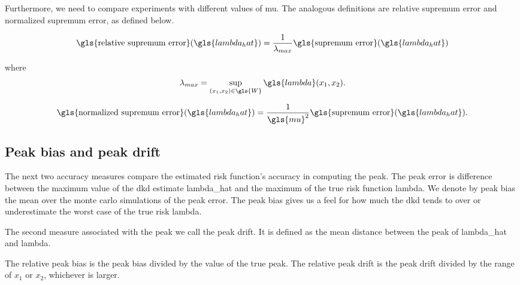 Furthermore, we need to compare experiments with different values of \gls{mu}.
The analogous definitions are \gls{relative supremum error} and \gls{normalized supremum error}, as defined below.

\begin{equation}
\label{eq:relative_supremum_error}
    \mbox{\gls{relative supremum error}}(\gls{lambda_hat}) = 
        \frac{1}{\lambda_{max}} \mbox{\gls{supremum error}}(\gls{lambda_hat}) \\
\end{equation}

where
\begin{equation}
\label{eq:lambda_max}
    \lambda_{max} = \sup_{(x_1, x_2) \in \gls{W}}{\gls{lambda}(x_1, x_2)} \text{.}
\end{equation}

\begin{equation}
\label{eq:normalized_supremum_error}
    \mbox{\gls{normalized supremum error}}(\gls{lambda_hat}) = 
        \frac{1}{\gls{mu}^2} \mbox{\gls{supremum error}}(\gls{lambda_hat}) \text{.}
\end{equation}

\subsection{Peak bias and peak drift}
\label{subsec:method:peak_bias}

The next two accuracy measures compare the estimated risk function's accuracy in computing the peak.
The \gls{peak error} is difference between the maximum value of the \gls{dkd} estimate \gls{lambda_hat} and the maximum of the true risk function \gls{lambda}.
We denote by \gls{peak bias} the mean over the monte carlo simulations of the \gls{peak error}.
The \gls{peak bias} gives us a feel for how much the \gls{dkd} tends to over or underestimate the worst case of the true risk \gls{lambda}.

The second measure associated with the peak we call the \gls{peak drift}.
It is defined as the mean distance between the peak of \gls{lambda_hat} and \gls{lambda}.

The \gls{relative peak bias} is the \gls{peak bias} divided by the value of the true peak.
The \gls{relative peak drift} is the \gls{peak drift} divided by the range of \(x_1\) or \(x_2\), whichever is larger.

